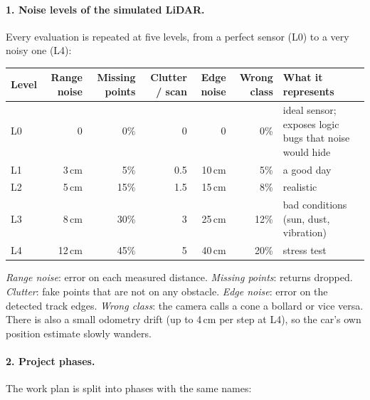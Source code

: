\documentclass[11pt,a4paper]{article}
\begin{document}
\paragraph{1. Noise levels of the simulated LiDAR.} Every evaluation is repeated at five levels, from a
perfect sensor (L0) to a very noisy one (L4):

\begin{table}[h]
\small
\begin{tabularx}{\linewidth}{@{}lrrrrrL@{}}
\toprule
Level & Range noise & Missing points & Clutter / scan & Edge noise & Wrong class & What it represents \\
\midrule
L0 & 0 & 0\% & 0 & 0 & 0\% & ideal sensor; exposes logic bugs that noise would hide \\
L1 & 3\,cm & 5\% & 0.5 & 10\,cm & 5\% & a good day \\
L2 & 5\,cm & 15\% & 1.5 & 15\,cm & 8\% & realistic \\
L3 & 8\,cm & 30\% & 3 & 25\,cm & 12\% & bad conditions (sun, dust, vibration) \\
L4 & 12\,cm & 45\% & 5 & 40\,cm & 20\% & stress test \\
\bottomrule
\end{tabularx}
\end{table}
\emph{Range noise}: error on each measured distance. \emph{Missing points}: returns dropped. \emph{Clutter}:
fake points that are not on any obstacle. \emph{Edge noise}: error on the detected track edges.
\emph{Wrong class}: the camera calls a cone a bollard or vice versa. There is also a small odometry drift
(up to 4\,cm per step at L4), so the car's own position estimate slowly wanders.

\paragraph{2. Project phases.} The work plan is split into phases with the same names:
\end{document}
